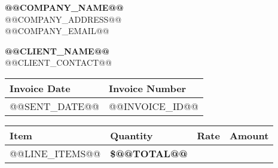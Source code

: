 \documentclass[11pt]{article}
\begin{document}
    \renewcommand{\arraystretch}{1.3}

    \begin{center}
    {\Huge \textbf{@@COMPANY_NAME@@}} \\
    \vspace{0.2cm}
    @@COMPANY_ADDRESS@@\\
    @@COMPANY_EMAIL@@
    \end{center}

    \vspace{1cm}

    \noindent
    \begin{minipage}{0.45\linewidth}
        \textbf{@@CLIENT_NAME@@} \\
        @@CLIENT_CONTACT@@  \\
    \end{minipage}
    \hfill
    \begin{minipage}{0.45\linewidth}
        \raggedleft
        \begin{tabular}{| C{3cm} | C{3cm} |}
            \hline
            \textbf{Invoice Date} & \textbf{Invoice Number} \\
            \hline
            @@SENT_DATE@@ & @@INVOICE_ID@@ \\
            \hline
        \end{tabular}
    \end{minipage}

    \vspace{1cm}

    \noindent
        \begin{tabularx}{\textwidth}{| X | R{1.5cm} | R{2cm} | R{2cm} |}
        \hline
            \textbf{Item} & \textbf{Quantity} & \textbf{Rate} & \textbf{Amount} \\
            \hline
            @@LINE_ITEMS@@
             &   \textbf{\$@@TOTAL@@} \\
        \end{tabularx}
\end{document}
